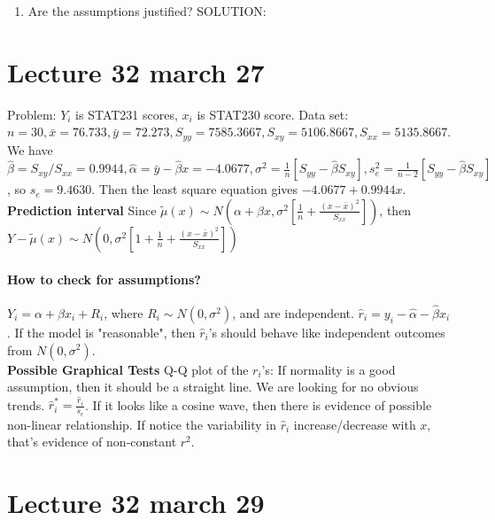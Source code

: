 \documentclass[10pt,letter]{article}
\theoremstyle{plain}
\theoremstyle{definition}
\begin{document}
\begin{enumerate}
    \item Are the assumptions justified? 
    SOLUTION:\\ 
    
\end{enumerate}

\section*{Lecture 32 march 27}
Problem: $Y_i$ is STAT231 scores, $x_i$ is STAT230 score. Data set: $n=30,\bar{x}=76.733,\bar{y}=72.273,S_{yy}=7585.3667,S_{xy}=5106.8667,S_{xx}=5135.8667$. We have $\hat\beta=S_{xy}/S_{xx}=0.9944,\hat\alpha=\bar{y}-\hat\beta x=-4.0677,\sigma^2=\frac{1}{n}[S_{yy}-\hat\beta S_{xy}],s_e^2=\frac{1}{n-2}[S_{yy}-\hat\beta S_{xy}]$, so $s_e=9.4630$. Then the least square equation gives $-4.0677+0.9944x$. \\ 
\textbf{Prediction interval}
Since $\tilde\mu(x)\sim N(\alpha+\beta x,\sigma^2\left[\frac{1}{n}+\frac{(x-\bar{x})^2}{S_{xx}}\right])$, then $Y-\tilde\mu(x)\sim N(0,\sigma^2[1+\frac{1}{n}+\frac{(x-\bar{x})^2}{S_{xx}}])$

\paragraph{How to check for assumptions?}
$Y_i=\alpha+\beta x_i+R_i$, where $R_i\sim N(0,\sigma^2)$, and are independent. $\hat{r}_i=y_i-\hat\alpha-\hat\beta x_i$. If the model is "reasonable", then $\hat{r}_i$'s should behave like independent outcomes from $N(0,\sigma^2)$. \\ 
\textbf{Possible Graphical Tests}
Q-Q plot of the $r_i$'s: If normality is a good assumption, then it should be a straight line. We are looking for no obvious trends. $\hat{r}_i^*=\frac{\hat{r}_i}{s_e}$. If it looks like a cosine wave, then there is evidence of possible non-linear relationship. If notice the variability in $\hat{r}_i$ increase/decrease with $x$, that's evidence of non-constant $r^2$. 


\section*{Lecture 32 march 29}
\end{document}
